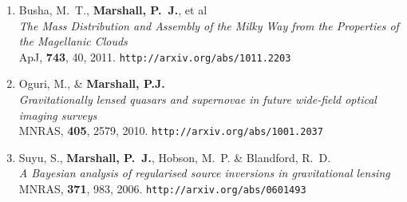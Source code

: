 \begin{enumerate}
\item{{Busha}, M.~T., \textbf{{Marshall}, P.~J.}, et al\\
\textit{The Mass Distribution and Assembly of the Milky Way from
the Properties of the Magellanic Clouds}\\
ApJ, \textbf{743}, 40, 2011.
\texttt{http://arxiv.org/abs/1011.2203}
}

\item{Oguri, M., \& \textbf{Marshall, P.J.}\\
\textit{Gravitationally lensed quasars and supernovae in future wide-field
optical imaging surveys}\\
MNRAS, \textbf{405}, 2579, 2010.
\texttt{http://arxiv.org/abs/1001.2037}
}

\item{Suyu, S., \textbf{{Marshall}, P.~J.}, Hobson, M.~P. \& Blandford, R.~D.\\
\textit{A Bayesian analysis of regularised source inversions in gravitational lensing}\\
MNRAS, \textbf{371}, 983, 2006.
\texttt{http://arxiv.org/abs/0601493}
}

\end{enumerate}



